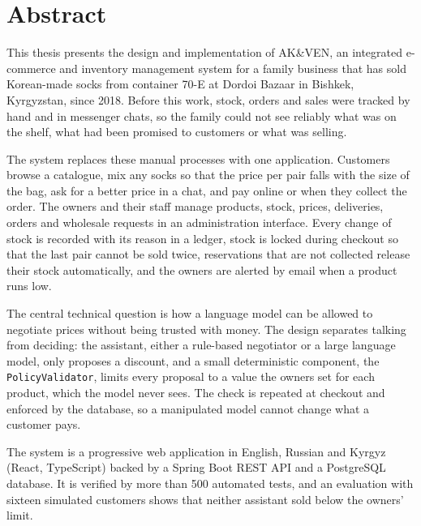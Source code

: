 \chapter*{Abstract}
\thispagestyle{plain}

This thesis presents the design and implementation of AK\&VEN, an integrated e-commerce and inventory management
system for a family business that has sold Korean-made socks from container 70-E at Dordoi Bazaar in Bishkek,
Kyrgyzstan, since 2018. Before this work, stock, orders and sales were tracked by hand and in messenger chats, so the
family could not see reliably what was on the shelf, what had been promised to customers or what was selling.

The system replaces these manual processes with one application. Customers browse a catalogue, mix any socks so
that the price per pair falls with the size of the bag, ask for a better price in a chat, and pay online or when they
collect the order. The owners and their staff manage products, stock,
prices, deliveries, orders and wholesale requests in an administration interface. Every change of stock is recorded
with its reason in a ledger, stock is locked during checkout so that the last pair cannot be sold twice, reservations
that are not collected release their stock automatically, and the owners are alerted by email when a product runs low.

The central technical question is how a language model can be allowed to negotiate prices without being trusted with
money. The design separates talking from deciding: the assistant, either a rule-based negotiator or a large language
model, only proposes a discount, and a small deterministic component, the \texttt{PolicyValidator}, limits every
proposal to a value the owners set for each product, which the model never sees. The check is repeated at checkout and
enforced by the database, so a manipulated model cannot change what a customer pays.

The system is a progressive web application in English, Russian and Kyrgyz (React, TypeScript) backed by a Spring Boot
REST API and a PostgreSQL database. It is verified by more than 500 automated tests, and an evaluation with sixteen
simulated customers shows that neither assistant sold below the owners' limit.
